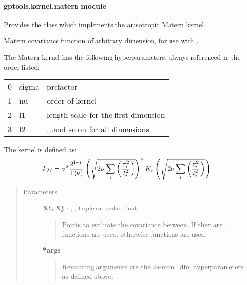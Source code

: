 \documentclass[letterpaper,10pt,english]{sphinxmanual}
\begin{document}
\paragraph{gptools.kernel.matern module}
\label{gptools.kernel:gptools-kernel-matern-module}\label{gptools.kernel:module-gptools.kernel.matern}
Provides the {\hyperref[gptools.kernel:gptools.kernel.matern.MaternKernel]{}} class which implements the anisotropic Matern kernel.

\begin{fulllineitems}
\label{gptools.kernel:gptools.kernel.matern.matern_function}
Matern covariance function of arbitrary dimension, for use with .

The Matern kernel has the following hyperparameters, always referenced in
the order listed:

\begin{tabulary}{\linewidth}{|L|L|L|}
\hline

0
 & 
sigma
 & 
prefactor
\\

1
 & 
nu
 & 
order of kernel
\\

2
 & 
l1
 & 
length scale for the first dimension
\\

3
 & 
l2
 & 
...and so on for all dimensions
\\
\hline\end{tabulary}


The kernel is defined as:
\begin{gather}
\begin{split}k_M = \sigma^2 \frac{2^{1-\nu}}{\Gamma(\nu)}
\left (\sqrt{2\nu \sum_i\left (\frac{\tau_i^2}{l_i^2}\right )}\right )^\nu
K_\nu\left(\sqrt{2\nu \sum_i\left(\frac{\tau_i^2}{l_i^2}\right)}\right)\end{split}\notag
\end{gather}\begin{quote}\begin{description}
\item[{Parameters}] \leavevmode
\textbf{Xi, Xj} : , , tuple or scalar float
\begin{quote}

Points to evaluate the covariance between. If they are ,
 functions are used, otherwise 
functions are used.
\end{quote}

\textbf{*args} :
\begin{quote}

Remaining arguments are the 2+num\_dim hyperparameters as defined above.
\end{quote}

\end{description}\end{quote}

\end{fulllineitems}
\end{document}
